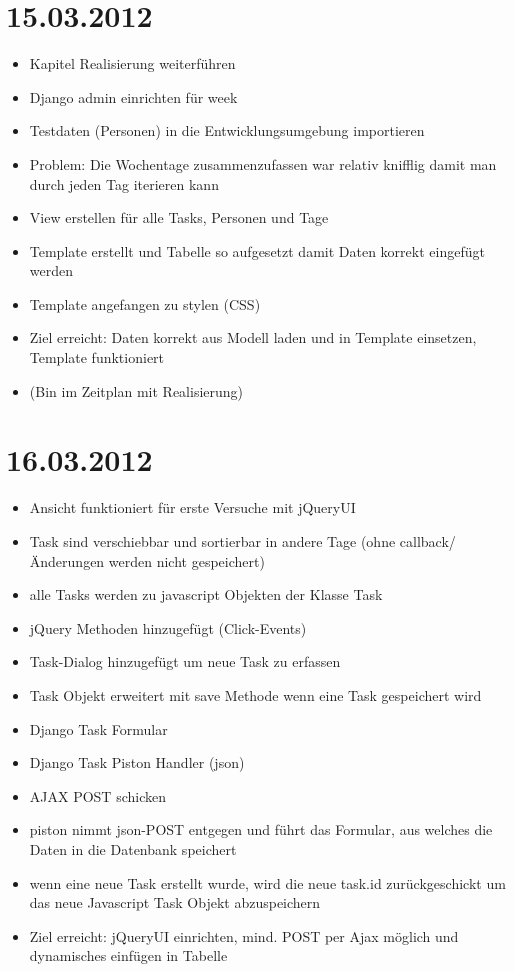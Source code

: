 \section{15.03.2012}
    \begin{itemize}
        \item Kapitel Realisierung weiterführen
        \item Django admin einrichten für week
        \item Testdaten (Personen) in die Entwicklungsumgebung importieren
        \item Problem: Die Wochentage zusammenzufassen war relativ knifflig damit man durch jeden Tag iterieren kann
        \item View erstellen für alle Tasks, Personen und Tage
        \item Template erstellt und Tabelle so aufgesetzt damit Daten korrekt eingefügt werden
        \item Template angefangen zu stylen (CSS)
        \item Ziel erreicht: Daten korrekt aus Modell laden und in Template einsetzen, Template funktioniert
        \item (Bin im Zeitplan mit Realisierung)
    \end{itemize}
\section{16.03.2012}
    \begin{itemize}
        \item Ansicht funktioniert für erste Versuche mit jQueryUI
        \item Task sind verschiebbar und sortierbar in andere Tage (ohne callback/Änderungen werden nicht gespeichert)
        \item alle Tasks werden zu javascript Objekten der Klasse Task
        \item jQuery Methoden hinzugefügt (Click-Events)
        \item Task-Dialog hinzugefügt um neue Task zu erfassen
        \item Task Objekt erweitert mit save Methode wenn eine Task gespeichert wird
        \item Django Task Formular
        \item Django Task Piston Handler (json)
        \item AJAX POST schicken
        \item piston nimmt json-POST entgegen und führt das Formular, aus welches die Daten in die Datenbank speichert
        \item wenn eine neue Task erstellt wurde, wird die neue task.id zurückgeschickt um das neue Javascript Task Objekt abzuspeichern
        \item Ziel erreicht: jQueryUI einrichten, mind. POST per Ajax möglich und dynamisches einfügen in Tabelle
    \end{itemize}
